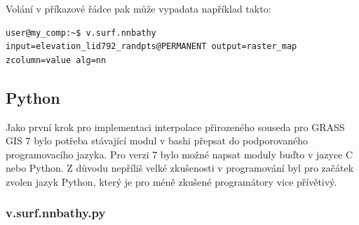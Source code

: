 \documentclass[12pt,a4paper]{article}
\begin{document}
\bigskip
{}

Volání v příkazové řádce pak může vypadata například takto:
\begin{lstlisting}[caption={bash version}]
user@my_comp:~$ v.surf.nnbathy input=elevation_lid792_randpts@PERMANENT output=raster_map zcolumn=value alg=nn
\end{lstlisting}

\newpage
\subsection{Python}
Jako první krok pro implementaci interpolace přirozeného souseda pro GRASS GIS 7 bylo potřeba stávající modul v bashi přepsat do podporovaného programovacího jazyka. Pro verzi 7 bylo možné napsat moduly buďto v jazyce C nebo Python. Z důvodu nepříliš velké zkušenosti v programování byl pro začátek zvolen jazyk Python, který je pro méně zkušené programátory vice přívětivý. 

\subsubsection{v.surf.nnbathy.py}
\end{document}
